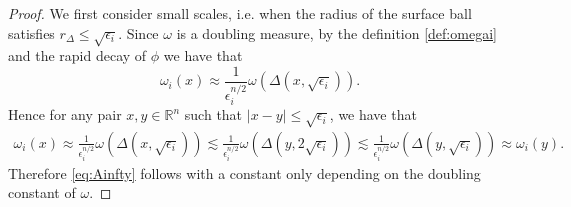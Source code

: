 \documentclass[11pt, a4paper,leqno]{amsart}
\theoremstyle{plain}
\theoremstyle{definition}
\theoremstyle{remark}
\numberwithin{equation}{section}
\begin{document}
\begin{proof}
We first consider small scales, i.e. when the radius of the surface ball satisfies $r_\Delta \leq \sqrt{\epsilon_i}$. Since $\omega$ is a doubling measure, by the definition \eqref{def:omegai} and the rapid decay of $\phi$ we have that
\[ \omega_i(x) \approx \frac{1}{\epsilon_i^{n/2}} \omega\left(\Delta(x, \sqrt{\epsilon_i}) \right). \]
Hence for any pair $x,y \in \mathbb{R}^n$ such that $|x-y| \leq \sqrt{\epsilon_i}$, we have that
\begin{align*}
	\omega_i(x) \approx \frac{1}{\epsilon_i^{n/2}} \omega\left(\Delta(x, \sqrt{\epsilon_i}) \right) \lesssim \frac{1}{\epsilon_i^{n/2}} \omega\left(\Delta(y, 2\sqrt{\epsilon_i}) \right) \lesssim \frac{1}{\epsilon_i^{n/2}} \omega(\Delta(y, \sqrt{\epsilon_i})) \approx \omega_i(y).
\end{align*}
Therefore \eqref{eq:Ainfty} follows with a constant only depending on the doubling constant of $\omega$.


\end{proof}
\end{document}
